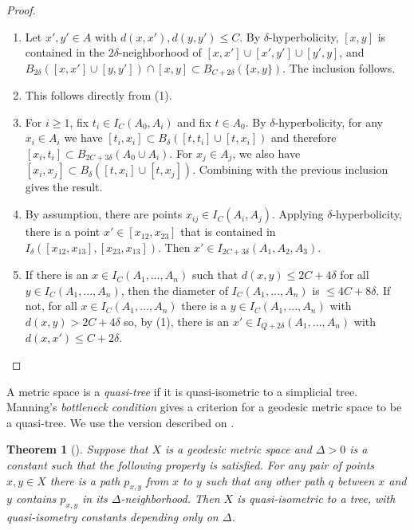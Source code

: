 \documentclass[11pt]{article}
\newtheorem{thm}{Theorem}[section]
\theoremstyle{remark}
\begin{document}
\begin{proof}
\begin{enumerate}
\item Let $x', y' \in A$ with $d(x,x'), d(y,y') \le C$. By $\delta$-hyperbolicity, $[x,y]$ is contained in the $2\delta$-neighborhood of $[x,x'] \cup [x', y'] \cup [y', y]$, and $B_{2\delta}([x,x']\cup [y,y']) \cap [x,y] \subset B_{C+2\delta}(\{x,y\})$. The inclusion follows.

\item This follows directly from (1).

\item For $i \ge 1$, fix $t_i \in I_C(A_0, A_i)$ and fix $t\in A_0$. By $\delta$-hyperbolicity, for any $x_i \in A_i$ we have $[t_i, x_i] \subset B_\delta([t,t_i] \cup [t, x_i])$ and therefore $[x_i, t_i] \subset B_{2C+3\delta}(A_0\cup A_i)$. For $x_j \in A_j$, we also have $[x_i, x_j] \subset B_{\delta}([t, x_i]\cup[t, x_j])$. Combining with the previous inclusion gives the result.

\item By assumption, there are points $x_{ij} \in I_C(A_i, A_j)$. Applying $\delta$-hyperbolicity, there is a point $x' \in [x_{12}, x_{23}]$ that is contained in $I_\delta([x_{12}, x_{13}], [x_{23}, x_{13}])$. Then $x' \in I_{2C+3\delta}(A_1, A_2, A_3)$.

\item If there is an $x \in I_C(A_1, \dots, A_n)$ such that $d(x,y) \le 2C+4\delta$ for all $y \in I_C(A_1, \dots, A_n)$, then the diameter of $I_C(A_1, \dots, A_n)$ is $\le 4C+8\delta$. If not, for all $x \in I_C(A_1, \dots, A_n)$ there is a $y \in I_C(A_1, \dots, A_n)$ with $d(x,y) > 2C+4\delta$ so, by (1), there is an $x' \in I_{Q+2\delta}(A_1, \dots, A_n)$ with $d(x,x') \le C+ 2\delta$.
\end{enumerate}
\end{proof}


A metric space is a {\em quasi-tree} if it is quasi-isometric to a simplicial tree. Manning's {\em bottleneck condition} gives a criterion for a geodesic metric space to be a quasi-tree. We use the version described on
\cite[Page 13]{BBF}. 

\begin{thm}[{\cite[Theorem 4.6]{M}}]
  \label{bottleneckcrit}
  Suppose that $X$ is a geodesic metric space and $\Delta>0$ is a constant such that the
  following property is satisfied. For any pair of points $x,y\in X$ there is a path $p_{x,y}$
  from $x$ to $y$ such that any other path $q$ between $x$ and $y$ contains $p_{x,y}$
  in its $\Delta$-neighborhood. Then $X$ is quasi-isometric to a tree, with quasi-isometry
  constants depending only on $\Delta$.
\end{thm}
\end{document}
